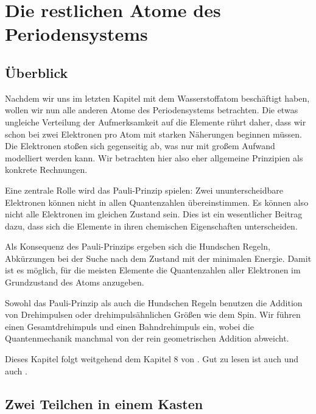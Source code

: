 \renewcommand{\lastmod}{15. November 2024}
\renewcommand{\chapterauthors}{Markus Lippitz}

\chapter{Die restlichen Atome des Periodensystems}



\section{Überblick}

Nachdem wir uns im letzten Kapitel mit dem Wasserstoffatom beschäftigt haben, wollen wir nun alle anderen Atome des Periodensystems betrachten. Die etwas ungleiche Verteilung der Aufmerksamkeit auf die Elemente rührt daher, dass wir schon bei zwei Elektronen pro Atom mit starken Näherungen beginnen müssen. Die Elektronen stoßen sich gegenseitig ab, was nur mit großem Aufwand modelliert werden kann. Wir betrachten hier also eher allgemeine Prinzipien als konkrete Rechnungen.

Eine zentrale Rolle wird das Pauli-Prinzip spielen: Zwei ununterscheidbare Elektronen können nicht in allen Quantenzahlen übereinstimmen. Es können also nicht alle Elektronen im gleichen Zustand sein. Dies ist ein wesentlicher Beitrag dazu, dass sich die Elemente in ihren chemischen Eigenschaften unterscheiden.

Als Konsequenz des Pauli-Prinzips ergeben sich die Hundschen Regeln, Abkürzungen bei der Suche nach dem Zustand mit der minimalen Energie. Damit ist es möglich, für die meisten Elemente die Quantenzahlen aller Elektronen im Grundzustand des Atoms anzugeben.

Sowohl das Pauli-Prinzip als auch die Hundschen Regeln benutzen die Addition von Drehimpulsen oder drehimpulsähnlichen Größen wie dem Spin. Wir führen einen Gesamtdrehimpuls und einen Bahndrehimpuls ein, wobei die Quantenmechanik manchmal von der rein geometrischen Addition abweicht.

Dieses Kapitel folgt weitgehend dem Kapitel 8 von \cite{Harris_moderne_Physik}. Gut zu lesen ist auch \cite{Demtröder_ep3} und auch \cite{Heintze_WTA}.

\section{Zwei Teilchen in einem Kasten}

